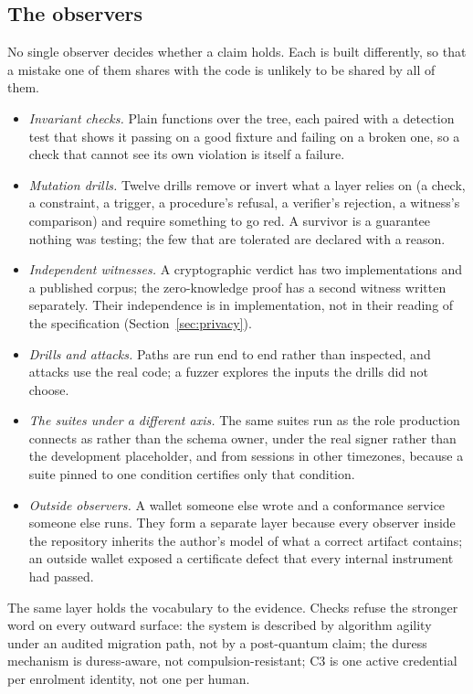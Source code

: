 \subsection{The observers}

No single observer decides whether a claim holds. Each is built differently, so that a mistake one
of them shares with the code is unlikely to be shared by all of them.

\begin{itemize}
  \item \emph{Invariant checks.} Plain functions over the tree, each paired with a detection test
    that shows it passing on a good fixture and failing on a broken one, so a check that cannot see
    its own violation is itself a failure.
  \item \emph{Mutation drills.} Twelve drills remove or invert what a layer relies on (a check, a
    constraint, a trigger, a procedure's refusal, a verifier's rejection, a witness's comparison) and
    require something to go red. A survivor is a guarantee nothing was testing; the few that are
    tolerated are declared with a reason.
  \item \emph{Independent witnesses.} A cryptographic verdict has two implementations and a
    published corpus; the zero-knowledge proof has a second witness written separately. Their
    independence is in implementation, not in their reading of the specification
    (Section~\ref{sec:privacy}).
  \item \emph{Drills and attacks.} Paths are run end to end rather than inspected, and attacks use
    the real code; a fuzzer explores the inputs the drills did not choose.
  \item \emph{The suites under a different axis.} The same suites run as the role production
    connects as rather than the schema owner, under the real signer rather than the development
    placeholder, and from sessions in other timezones, because a suite pinned to one condition
    certifies only that condition.
  \item \emph{Outside observers.} A wallet someone else wrote and a conformance service someone else
    runs. They form a separate layer because every observer inside the repository inherits the
    author's model of what a correct artifact contains; an outside wallet exposed a certificate
    defect that every internal instrument had passed.
\end{itemize}

The same layer holds the vocabulary to the evidence. Checks refuse the stronger word on every
outward surface: the system is described by algorithm agility under an audited migration path, not
by a post-quantum claim; the duress mechanism is duress-aware, not compulsion-resistant; C3 is one
active credential per enrolment identity, not one per human.

